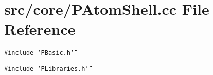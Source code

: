 \section{src/core/PAtom\-Shell.cc File Reference}
\label{PAtomShell_8cc}


{\tt \#include \char`\"{}PBasic.h\char`\"{}}\par
{\tt \#include \char`\"{}PLibraries.h\char`\"{}}\par
